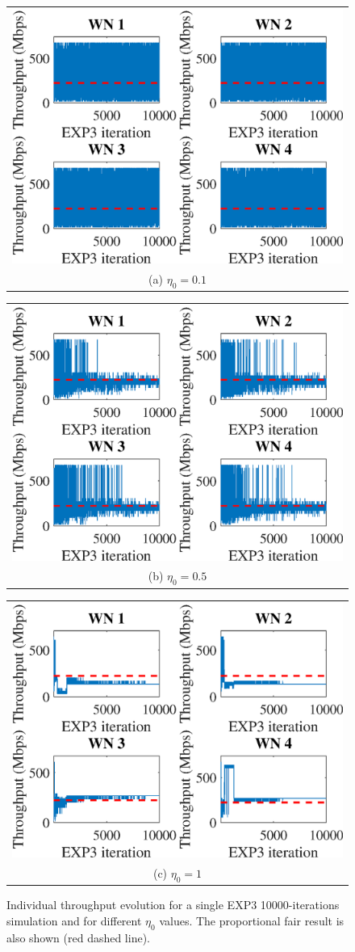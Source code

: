 \documentclass[10pt,journal,compsoc]{IEEEtran}
\begin{document}
	\begin{figure}
		\centering
		\begin{tabular}{@{}c@{}}
			\includegraphics[width=.25\textwidth]{images/NEW_temporal_individual_tpt_EXP3_eta01} \\[\abovecaptionskip]
			\small (a) $\eta_0 = 0.1$
			\label{fig:exp3_eta01_ind_tpt}
		\end{tabular}	
		\hspace{\floatsep}	
		\begin{tabular}{@{}c@{}}
			\includegraphics[width=.25\textwidth]{images/NEW_temporal_individual_tpt_EXP3_eta05} \\[\abovecaptionskip]
			\small (b) $\eta_0 = 0.5$
			\label{fig:exp3_eta05_ind_tpt}
		\end{tabular}
		\hspace{\floatsep}
		\begin{tabular}{@{}c@{}}
			\includegraphics[width=.25\textwidth]{images/NEW_temporal_individual_tpt_EXP3_eta1} \\[\abovecaptionskip]
			\small (c) $\eta_0 = 1$
			\label{fig:exp3_eta1_ind_tpt}
		\end{tabular}
		\caption{Individual throughput evolution for a single EXP3 10000-iterations simulation and for different $\eta_0$ values. The proportional fair result is also shown (red dashed line).}
		\label{fig:exp3_ind_tpt}
	\end{figure}
	
\end{document}
